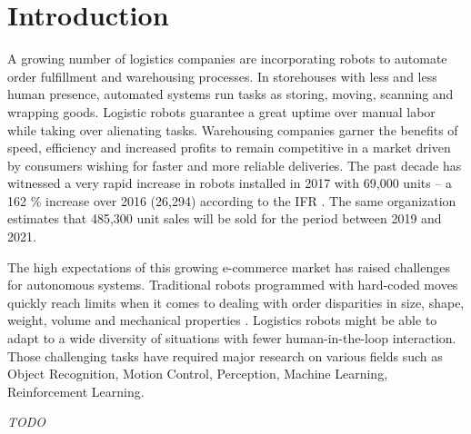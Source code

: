 \documentclass[/home/francois/latex/report/main.tex]{subfiles}
\begin{document}
\chapter{Introduction}

A growing number of logistics companies are incorporating robots to automate order fulfillment and warehousing processes. In storehouses with less and less human presence, automated systems run tasks as storing, moving, scanning and wrapping goods. Logistic robots guarantee a great uptime over manual labor while taking over alienating tasks. Warehousing companies garner the benefits of speed, efficiency and increased profits to remain competitive in a market driven by consumers wishing for faster and more reliable deliveries. The past decade has witnessed a very rapid increase in robots installed in 2017 with 69,000 units – a 162 \% increase over 2016 (26,294) according to the \ac{IFR} \cite{industrialRobot2018}. The same organization estimates that 485,300 unit sales will be sold for the period between 2019 and 2021.

The high expectations of this growing e-commerce market has raised challenges for autonomous systems. Traditional robots programmed with hard-coded moves quickly reach limits when it comes to dealing with order disparities in size, shape, weight, volume and mechanical properties \cite{GQHuang2015}. Logistics robots might be able to adapt to a wide diversity of situations with fewer human-in-the-loop interaction. Those challenging tasks have required major research on various fields such as Object Recognition, Motion Control, Perception, Machine Learning, Reinforcement Learning.

\textit{TODO}
\end{document}
